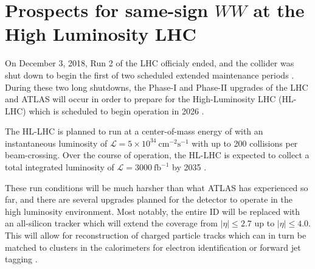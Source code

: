 \chapter[Prospects for same-sign $WW$ at the High Luminosity LHC][Prospects for same-sign $WW$ at the High Luminosity LHC]{Prospects for same-sign $WW$ at the High Luminosity LHC}
\label{ch:sswwupgrade}


On December 3, 2018, Run 2 of the LHC officialy ended, and the collider was shut down to begin the first of two scheduled extended maintenance periods \cite{2018.cern-press-run2}.
During these two long shutdowns, the Phase-I and Phase-II upgrades of the LHC and ATLAS will occur in order to prepare for the High-Luminosity LHC (HL-LHC) which is scheduled to begin operation in 2026 \cite{2011.atlas-phase1-loi}.

The HL-LHC is planned to run at a center-of-mass energy of  with an instantaneous luminosity of $\mathcal{L}=5\times 10^{34}~\textrm{cm}^{-2}\textrm{s}^{-1}$ with up to 200 collisions per beam-crossing. 
Over the course of operation, the HL-LHC is expected to collect a total integrated luminosity of $\mathcal{L} = 3000~\mathrm{fb}^{-1}$ by 2035 \cite{2015.hllhc-design-report}. 

These run conditions will be much harsher than what ATLAS has experienced so far, and there are several upgrades planned for the detector to operate in the high luminosity environment.
Most notably, the entire ID will be replaced with an all-silicon tracker which will extend the coverage from $|\eta| \le 2.7$ up to $|\eta| \le 4.0$.
This will allow for reconstruction of charged particle tracks which can in turn be matched to clusters in the calorimeters for electron identification or forward jet tagging \cite{2015.atlas-phase2-scoping}.

